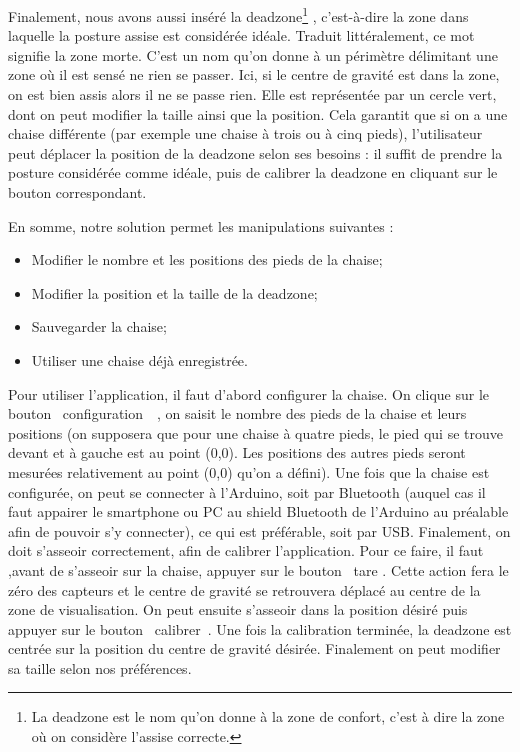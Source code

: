 \documentclass{polytech/polytech}
\begin{document}
Finalement, nous avons aussi inséré la \guillemotleft  deadzone\footnote{La deadzone est le nom qu'on donne à la zone de confort, c'est à dire la zone où on considère l'assise correcte.} \guillemotright, c'est-à-dire la zone dans laquelle la posture assise est considérée idéale. Traduit littéralement, ce mot signifie la zone morte. C'est un nom qu'on donne à un périmètre délimitant une zone où il est sensé ne rien se passer. Ici, si le centre de gravité est dans la zone, on est bien assis alors il ne se passe rien. Elle est représentée par un cercle vert, dont on peut modifier la taille ainsi que la position. Cela garantit que si on a une chaise différente (par exemple une chaise à trois ou à cinq pieds), l'utilisateur peut déplacer la position de la deadzone selon ses besoins : il suffit de prendre la posture considérée comme idéale, puis de calibrer la deadzone en cliquant sur le bouton correspondant.

En somme, notre solution permet les manipulations suivantes :
\begin{itemize}
\item Modifier le nombre et les positions des pieds de la chaise;
\item Modifier la position et la taille de la deadzone;
\item Sauvegarder la chaise;
\item Utiliser une chaise déjà enregistrée.
\end{itemize}


Pour utiliser l'application, il faut d'abord configurer la chaise. On clique sur le bouton \guillemotleft ~configuration~\guillemotright\ , on saisit le nombre des pieds de la chaise et leurs positions (on supposera que pour une chaise à quatre pieds, le pied qui se trouve devant et à gauche est au point (0,0). Les positions des autres pieds seront mesurées relativement au point (0,0) qu'on a défini).
 Une fois que la chaise est configurée, on peut se connecter à l'Arduino, soit par Bluetooth (auquel cas il faut appairer le smartphone ou PC au shield Bluetooth de l'Arduino au préalable afin de pouvoir s'y connecter), ce qui est préférable, soit par USB. 
Finalement, on doit s'asseoir correctement, afin de calibrer l'application.
Pour ce faire, il faut ,avant de s'asseoir sur la chaise, appuyer sur le bouton \guillemotleft ~tare \guillemotright . Cette action fera le zéro des capteurs et le centre de gravité se retrouvera déplacé au centre de la zone de visualisation. On peut ensuite s'asseoir dans la position désiré puis appuyer sur le bouton \guillemotleft\ calibrer~\guillemotright . Une fois la calibration terminée, la deadzone est centrée sur la position du centre de gravité désirée. Finalement on peut modifier sa taille selon nos préférences. 
\end{document}
